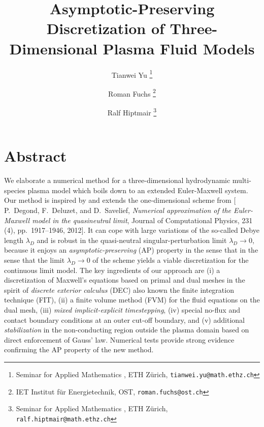 \documentclass{article}
\title{Asymptotic-Preserving Discretization of Three-Dimensional Plasma Fluid Models}
\author[]{Tianwei Yu \thanks{Seminar for Applied Mathematics , ETH Z\"{u}rich, \texttt{tianwei.yu@math.ethz.ch}}}
\author[]{Roman Fuchs \thanks{IET Institut für Energietechnik, OST, \texttt{roman.fuchs@ost.ch}}}
\author[]{Ralf Hiptmair \thanks{Seminar for Applied Mathematics , ETH Z\"{u}rich, \texttt{ralf.hiptmair@math.ethz.ch}}}
\affil[]{}
\date{}
\newcommand{\todo}[1]{\textcolor{blue}{\fbox{\textbf{TODO: #1}}}}
\begin{document}
\maketitle

\section*{Abstract}

We elaborate a numerical method for a three-dimensional hydrodynamic multi-species plasma
model which boils down to an extended Euler-Maxwell system. Our method is inspired by and
extends the one-dimensional scheme from $[$P.~Degond, F.~Deluzet, and D.~Savelief,
\emph{Numerical approximation of the Euler-Maxwell model in the quasineutral limit}, Journal of
Computational Physics, 231 (4), pp.~1917--1946, 2012$]$. It can cope with large variations
of the so-called Debye length $\lambda_D$ and is robust in the quasi-neutral
singular-perturbation limit $\lambda_D\to 0$, because it enjoys an
\emph{asymptotic-preserving} (AP) property in the sense that in the sense that the limit
$\lambda_D\to 0$ of the scheme yields a viable discretization for the continuous limit
model. The key ingredients of our approach are (i) a discretization of Maxwell's equations
based on primal and dual meshes in the spirit of \emph{discrete exterior calculus} (DEC)
also known the finite integration technique (FIT), (ii) a finite volume method (FVM) for
the fluid equations on the dual mesh, (iii) \emph{mixed implicit-explicit timestepping},
(iv) special no-flux and contact boundary conditions at an outer cut-off boundary, and (v)
additional \emph{stabilization} in the non-conducting region outside the plasma domain
based on direct enforcement of Gauss' law. Numerical tests provide strong evidence
confirming the AP property of the new method.



\end{document}

